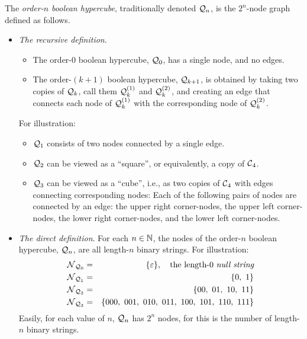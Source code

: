 The {\it order-$n$ boolean hypercube}, traditionally denoted $\mbox{$\cal Q$}_n$,
is the $2^n$-node graph defined as follows.
\begin{itemize}
\item
{\it The recursive definition}. 
  \begin{itemize}
  \item
The order-$0$ boolean hypercube, $\mbox{$\cal Q$}_0$, has a single node, and no
edges.
  \item
The order-$(k+1)$ boolean hypercube, $\mbox{$\cal Q$}_{k+1}$, is obtained by taking
two copies of $\mbox{$\cal Q$}_k$, call them $\mbox{$\cal Q$}_k^{(1)}$ and $\mbox{$\cal Q$}_k^{(2)}$, and
creating an edge that connects each node of $\mbox{$\cal Q$}_k^{(1)}$ with the
corresponding node of $\mbox{$\cal Q$}_k^{(2)}$.
  \end{itemize}
For illustration:
  \begin{itemize}
  \item
$\mbox{$\cal Q$}_1$ consists of two nodes connected by a single edge.
  \item
$\mbox{$\cal Q$}_2$ can be viewed as a ``square'', or equivalently, a copy of $\mbox{$\cal C$}_4$.
  \item
$\mbox{$\cal Q$}_3$ can be viewed as a ``cube'', i.e., as two copies of $\mbox{$\cal C$}_4$
    with edges connecting corresponding nodes: Each of the following
    pairs of nodes are connected by an edge: the upper right
    corner-nodes, the upper left corner-nodes, the lower right
    corner-nodes, and the lower left corner-nodes.
  \end{itemize}

\item
{\it The direct definition}.
For each $n \in \mathbb{N}$, the nodes of the order-$n$ boolean hypercube,
$\mbox{$\cal Q$}_n$, are all length-$n$ binary strings.  For illustration:
\begin{eqnarray*}
\mbox{$\cal N$}_{{\mbox{{\scriptsize $\cal Q$}}}_0}
  & = & 
\{ \varepsilon \}, \ \ \mbox{ the length-$0$ {\em null string}} \\ 
\mbox{$\cal N$}_{{\mbox{{\scriptsize $\cal Q$}}}_1}
  & = &
\{ 0, \ 1 \} \\
\mbox{$\cal N$}_{{\mbox{{\scriptsize $\cal Q$}}}_2}
  & = & \{ 00, \ 01, \ 10, \ 11 \} \\
\mbox{$\cal N$}_{{\mbox{{\scriptsize $\cal Q$}}}_3}
  & = & \{ 000, \ 001, \ 010, \ 011, \ 100, \ 101, \ 110, \ 111 \} 
\end{eqnarray*}
Easily, for each value of $n$, $\mbox{$\cal Q$}_n$ has $2^n$ nodes, for this is the
number of length-$n$ binary strings.

\medskip


\end{itemize}

